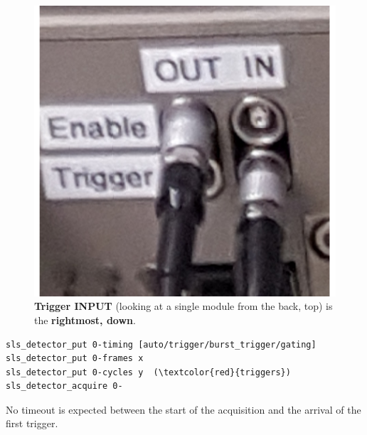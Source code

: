 \documentclass{article}
\begin{document}
{{{\begin{figure}[t]
\begin{center}
\includegraphics[width=.4\textwidth]{tiggerIN}
\end{center}
\caption{\textbf{Trigger INPUT} (looking at a single module from the back, top) is the \textbf{rightmost, down}.}
\label{triggerIN}
\end{figure}

\begin{verbatim}
sls_detector_put 0-timing [auto/trigger/burst_trigger/gating]
sls_detector_put 0-frames x
sls_detector_put 0-cycles y  (\textcolor{red}{triggers})
sls_detector_acquire 0-
\end{verbatim}
No timeout is expected between the start of the acquisition and the arrival of the first trigger. 

}}}
\end{document}
